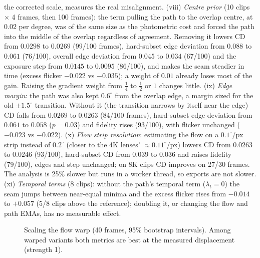 \documentclass[11pt]{article}
\begin{document}
the corrected scale, measures the real misalignment. (viii) \emph{Centre prior} (10 clips $\times$ 4 frames, then 100 frames): the term pulling the path to the overlap centre, at $0.02$ per degree, was of the same size as the photometric cost and forced the path into the middle of the overlap regardless of agreement. Removing it lowers CD from $0.0298$ to $0.0269$ (99/100 frames), hard-subset edge deviation from $0.088$ to $0.061$ (76/100), overall edge deviation from $0.045$ to $0.034$ (67/100) and the exposure step from $0.0145$ to $0.0095$ (86/100), and makes the seam steadier in time (excess flicker $-0.022$ vs $-0.035$); a weight of $0.01$ already loses most of the gain. Raising the gradient weight from $\tfrac14$ to $\tfrac12$ or $1$ changes little. (ix) \emph{Edge margin}: the path was also kept $0.6^\circ$ from the overlap edge, a margin sized for the old $\pm1.5^\circ$ transition. Without it (the transition narrows by itself near the edge) CD falls from $0.0269$ to $0.0263$ (84/100 frames), hard-subset edge deviation from $0.061$ to $0.058$ ($p=0.03$) and fidelity rises (93/100), with flicker unchanged ($-0.023$ vs $-0.022$). (x) \emph{Flow strip resolution}: estimating the flow on a $0.1^\circ$/px strip instead of $0.2^\circ$ (closer to the 4K lenses' $\approx0.11^\circ$/px) lowers CD from $0.0263$ to $0.0246$ (93/100), hard-subset CD from $0.039$ to $0.036$ and raises fidelity (79/100), edges and step unchanged; on 8K clips CD improves on 27/30 frames. The analysis is 25\% slower but runs in a worker thread, so exports are not slower. (xi) \emph{Temporal terms} (8 clips): without the path's temporal term ($\lambda_t=0$) the seam jumps between near-equal minima and the excess flicker rises from $-0.014$ to $+0.057$ (5/8 clips above the reference); doubling it, or changing the flow and path EMAs, has no measurable effect.

\begin{figure}[t]
\centering
{}
\caption{Scaling the flow warp (40 frames, 95\% bootstrap intervals). Among warped variants both metrics are best at the measured displacement (strength 1).}
\label{fig:warp}
\end{figure}
\end{document}
